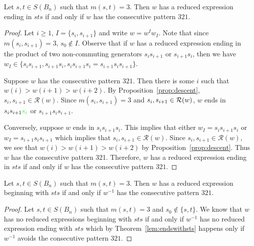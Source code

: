 \begin{lemma}\label{lem:sts}
Let $s,t \in S(B_n)$ such that $m(s,t)=3$. Then $w$ has a reduced expression ending in $sts$ if and only if $w$ has the consecutive pattern $321$.
\begin{proof}
	Let $i \geq 1$, $I=\{s_i,s_{i+1}\}$ and write $w=w^Iw_I$. Note that since $m(s_i,s_{i+1})=3$, $s_0 \notin I$. Observe that if $w$ has a reduced expression ending in the product of two non-commuting generators $s_is_{i+1}$ or $s_{i+1}s_i$, then we have $w_I \in \{s_is_{i+1}, s_{i+1}s_i, s_is_{i+1}s_i=s_{i+1}s_is_{i+1}\}$.
	
	Suppose $w$ has the consecutive pattern $321$. Then there is some $i$ such that $w(i) > w(i+1) > w(i+2)$. By Proposition~\ref{prop:descent}, $s_i,s_{i+1} \in \mathcal{R}(w)$. Since $m(s_i,s_{i+1})=3$ and $s_i, s_{i+1} \in \mathcal{R}(w)$, $w$ ends in $s_is_{i+1}\textcolor{green}{s_{i}}$ or $s_{i+1}s_is_{i+1}$.
	
	Conversely, suppose $w$ ends in $s_is_{i+1}s_i$. This implies that either $w_I=s_is_{i+1}s_i$ or $w_I=s_{i+1}s_is_{i+1}$ which implies that $s_i,s_{i+1} \in \mathcal{R}(w)$. Since $s_i,s_{i+1} \in \mathcal{R}(w)$, we see that $w(i)>w(i+1)>w(i+2)$ by Proposition~\ref{prop:descent}. Thus $w$ has the consecutive pattern 321.
	Therefore, $w$ has a reduced expression ending in $sts$ if and only if $w$ has the consecutive pattern $321$. 
\end{proof}	
\end{lemma}

\begin{corollary}\label{lem:endswithsts}
	Let $s,t \in S(B_n)$ such that $m(s,t)=3$. Then $w$ has a reduced expression beginning with $sts$ if and only if $w^{-1}$ has the consecutive pattern $321$.
	\begin{proof}
		Let $s,t \in S(B_n)$ such that $m(s,t)=3$ and $s_0 \notin\{s,t\}$. We know that $w$ has no reduced expressions beginning with $sts$ if and only if $w^{-1}$ has no reduced expression ending with $sts$ which by Theorem~\ref{lem:endswithsts} happens only if $w^{-1}$ avoids the consecutive pattern $321$.
	\end{proof}
\end{corollary}

